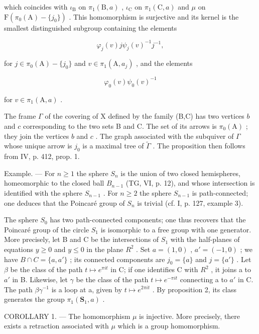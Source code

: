 which coincides with \(\iota_{\mathrm{B}}\) on \(\pi_1(\mathrm{B},a)\) , \(\iota_{\mathrm{C}}\) on \(\pi_1(\mathrm{C},a)\) and \(\mu\) on \(\mathrm{F}(\pi_0(\mathrm{A}) - \{j_0\})\) . This homomorphism is surjective and its kernel is the smallest distinguished subgroup containing the elements

\[
\varphi_ {j} (v) j \psi_ {j} (v) ^ {- 1} j ^ {- 1},
\]

for \(j\in \pi_0(\mathrm{A}) - \{j_0\}\) and \(v\in \pi_1(\mathrm{A},a_j)\) , and the elements

\[
\varphi_ {0} (v) \psi_ {0} (v) ^ {- 1}
\]

for \(v \in \pi_1(\mathrm{A}, a)\) .

The frame \(\Gamma\) of the covering of X defined by the family (B,C) has two vertices \(b\) and \(c\) corresponding to the two sets B and C. The set of its arrows is \(\pi_0(\mathrm{A})\) ; they join the vertices \(b\) and \(c\) . The graph associated with the subquiver of \(\Gamma\) whose unique arrow is \(j_0\) is a maximal tree of \(\widetilde{\Gamma}\) . The proposition then follows from IV, p. 412, prop. 1.

Example. --- For \(n \geqslant 1\) the sphere \(S_{n}\) is the union of two closed hemispheres, homeomorphic to the closed ball \(B_{n-1}\) (TG, VI, p. 12), and whose intersection is identified with the sphere \(S_{n-1}\) . For \(n \geqslant 2\) the sphere \(S_{n-1}\) is path-connected; one deduces that the Poincaré group of \(S_{n}\) is trivial (cf. I, p. 127, example 3).

The sphere \(S_{0}\) has two path-connected components; one thus recovers that the Poincaré group of the circle \(S_{1}\) is isomorphic to a free group with one generator. More precisely, let B and C be the intersections of \(S_{1}\) with the half-planes of equations \(y \geqslant 0\) and \(y \leqslant 0\) in the plane \(R^{2}\) . Set \(a = (1,0)\) , \(a' = (-1,0)\) ; we have \(B \cap C = \{a, a'\}\) ; its connected components are \(j_{0} = \{a\}\) and \(j = \{a'\}\) . Let \(\beta\) be the class of the path \(t \mapsto e^{\pi it}\) in C; if one identifies C with \(R^{2}\) , it joins a to \(a'\) in B. Likewise, let \(\gamma\) be the class of the path \(t \mapsto e^{-\pi it}\) connecting a to \(a'\) in C. The path \(\beta\gamma^{-1}\) is a loop at a, given by \(t \mapsto e^{2\pi it}\) . By proposition 2, its class generates the group \(\pi_{1}(\mathbf{S}_{1}, a)\) .

COROLLARY 1. --- The homomorphism \(\mu\) is injective. More precisely, there exists a retraction associated with \(\mu\) which is a group homomorphism.

